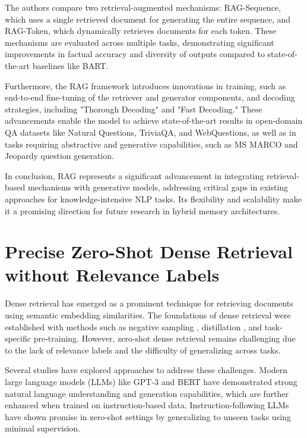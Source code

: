 The authors compare two retrieval-augmented mechanisms: RAG-Sequence, which uses a single retrieved document for generating the entire sequence, and RAG-Token, which dynamically retrieves documents for each token. These mechanisms are evaluated across multiple tasks, demonstrating significant improvements in factual accuracy and diversity of outputs compared to state-of-the-art baselines like BART.

Furthermore, the RAG framework introduces innovations in training, such as end-to-end fine-tuning of the retriever and generator components, and decoding strategies, including "Thorough Decoding" and "Fast Decoding." These advancements enable the model to achieve state-of-the-art results in open-domain QA datasets like Natural Questions, TriviaQA, and WebQuestions, as well as in tasks requiring abstractive and generative capabilities, such as MS MARCO and Jeopardy question generation.

In conclusion, RAG represents a significant advancement in integrating retrieval-based mechanisms with generative models, addressing critical gaps in existing approaches for knowledge-intensive NLP tasks. Its flexibility and scalability make it a promising direction for future research in hybrid memory architectures.

\section*{Precise Zero-Shot Dense Retrieval without Relevance Labels}


Dense retrieval has emerged as a prominent technique for retrieving documents using semantic embedding similarities. The foundations of dense retrieval were established with methods such as negative sampling \cite{xu2022negativesamplingcontrastiverepresentation}, distillation \cite{hinton2015distillingknowledgeneuralnetwork}, and task-specific pre-training. However, zero-shot dense retrieval remains challenging due to the lack of relevance labels and the difficulty of generalizing across tasks.

Several studies have explored approaches to address these challenges. Modern large language models (LLMs) like GPT-3 \cite{gpt3} and BERT \cite{devlin2019bertpretrainingdeepbidirectional} have demonstrated strong natural language understanding and generation capabilities, which are further enhanced when trained on instruction-based data. Instruction-following LLMs have shown promise in zero-shot settings by generalizing to unseen tasks using minimal supervision.

